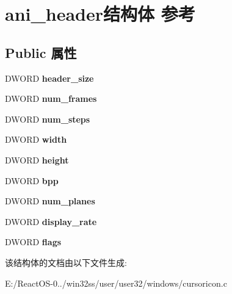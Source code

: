 \hypertarget{structani__header}{}\section{ani\+\_\+header结构体 参考}
\label{structani__header}
\subsection*{Public 属性}
\begin{DoxyCompactItemize}
\item 
\mbox{\label{structani__header_aa40d4a5ff9ba7fd8d1d06ae440acffb4}} 
D\+W\+O\+RD {\bfseries header\+\_\+size}
\item 
\mbox{\label{structani__header_a25231a649d3f8639072267cca9994fff}} 
D\+W\+O\+RD {\bfseries num\+\_\+frames}
\item 
\mbox{\label{structani__header_af9d83fbe8cfb85c31068ccb7d2a95483}} 
D\+W\+O\+RD {\bfseries num\+\_\+steps}
\item 
\mbox{\label{structani__header_a2cbc673cd5d31fa58acfb56b032dc0a4}} 
D\+W\+O\+RD {\bfseries width}
\item 
\mbox{\label{structani__header_a861ed5a721d723f4f110a1775f6bb0a8}} 
D\+W\+O\+RD {\bfseries height}
\item 
\mbox{\label{structani__header_ab1ffbd224eb2073b321c79d60737a02e}} 
D\+W\+O\+RD {\bfseries bpp}
\item 
\mbox{\label{structani__header_a8b52119d32787f6f2fc7d75d549b6270}} 
D\+W\+O\+RD {\bfseries num\+\_\+planes}
\item 
\mbox{\label{structani__header_a3f89ead4233ec704e36adef60eaecffb}} 
D\+W\+O\+RD {\bfseries display\+\_\+rate}
\item 
\mbox{\label{structani__header_a278e3225a95816a34517da2418add025}} 
D\+W\+O\+RD {\bfseries flags}
\end{DoxyCompactItemize}


该结构体的文档由以下文件生成\+:\begin{DoxyCompactItemize}
\item 
E\+:/\+React\+O\+S-\/0../win32ss/user/user32/windows/cursoricon.\+c\end{DoxyCompactItemize}
